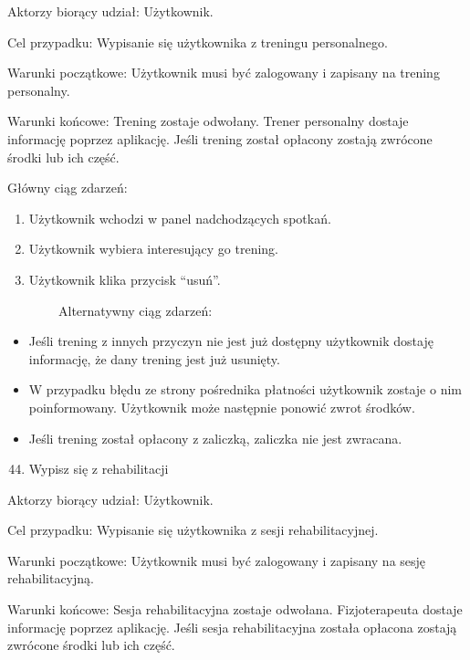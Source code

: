 {Aktorzy biorący udział: Użytkownik.}

{Cel przypadku: Wypisanie się użytkownika z treningu personalnego.}

{Warunki początkowe: Użytkownik musi być zalogowany i zapisany na
trening personalny. }

{Warunki końcowe: Trening zostaje odwołany. Trener personalny dostaje
informację poprzez aplikację. Jeśli trening został opłacony zostają
zwrócone środki lub ich część.}

{Główny ciąg zdarzeń: }

\begin{enumerate}
\tightlist
\item
  {Użytkownik wchodzi w panel nadchodzących spotkań.}
\item
  {Użytkownik wybiera interesujący go trening.}
\item
  {Użytkownik klika przycisk ``usuń''.}
\end{enumerate}

{~~~~~~~~Alternatywny ciąg zdarzeń:}

\begin{itemize}
\tightlist
\item
  {Jeśli trening z innych przyczyn nie jest już dostępny użytkownik
  dostaję informację, że dany trening jest już usunięty.}
\item
  {W przypadku błędu ze strony pośrednika płatności użytkownik zostaje o
  nim poinformowany. Użytkownik może następnie ponowić zwrot środków.}
\item
  {Jeśli trening został opłacony z zaliczką, zaliczka nie jest
  zwracana.}
\end{itemize}

{}

\begin{enumerate}
\setcounter{enumi}{43}
\tightlist
\item
  {Wypisz się z rehabilitacji}
\end{enumerate}

{Aktorzy biorący udział: Użytkownik.}

{Cel przypadku: Wypisanie się użytkownika z sesji rehabilitacyjnej.}

{Warunki początkowe: Użytkownik musi być zalogowany i zapisany na sesję
rehabilitacyjną. }

{Warunki końcowe: Sesja rehabilitacyjna zostaje odwołana. Fizjoterapeuta
dostaje informację poprzez aplikację. Jeśli sesja rehabilitacyjna
została opłacona zostają zwrócone środki lub ich część.}

